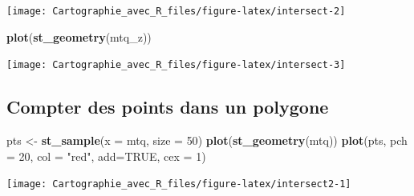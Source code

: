 \documentclass[]{book}
\newenvironment{Shaded}{\begin{snugshade}}{\end{snugshade}}
\newcommand{\KeywordTok}[1]{\textcolor[rgb]{0.13,0.29,0.53}{\textbf{#1}}}
\newcommand{\DataTypeTok}[1]{\textcolor[rgb]{0.13,0.29,0.53}{#1}}
\newcommand{\DecValTok}[1]{\textcolor[rgb]{0.00,0.00,0.81}{#1}}
\newcommand{\StringTok}[1]{\textcolor[rgb]{0.31,0.60,0.02}{#1}}
\newcommand{\OtherTok}[1]{\textcolor[rgb]{0.56,0.35,0.01}{#1}}
\newcommand{\OperatorTok}[1]{\textcolor[rgb]{0.81,0.36,0.00}{\textbf{#1}}}
\newcommand{\NormalTok}[1]{#1}
\begin{document}
\begin{center}\texttt{[image: Cartographie\_avec\_R\_files/figure-latex/intersect-2]} \end{center}

\begin{Shaded}
\begin{Highlighting}[]
\KeywordTok{plot}\NormalTok{(}\KeywordTok{st_geometry}\NormalTok{(mtq_z))}
\end{Highlighting}
\end{Shaded}

\begin{center}\texttt{[image: Cartographie\_avec\_R\_files/figure-latex/intersect-3]} \end{center}

\subsection{Compter des points dans un
polygone}\label{compter-des-points-dans-un-polygone}

\begin{Shaded}
\begin{Highlighting}[]
\NormalTok{pts <-}\StringTok{ }\KeywordTok{st_sample}\NormalTok{(}\DataTypeTok{x =}\NormalTok{ mtq, }\DataTypeTok{size =} \DecValTok{50}\NormalTok{)}
\KeywordTok{plot}\NormalTok{(}\KeywordTok{st_geometry}\NormalTok{(mtq))}
\KeywordTok{plot}\NormalTok{(pts, }\DataTypeTok{pch =} \DecValTok{20}\NormalTok{, }\DataTypeTok{col =} \StringTok{"red"}\NormalTok{, }\DataTypeTok{add=}\OtherTok{TRUE}\NormalTok{, }\DataTypeTok{cex =} \DecValTok{1}\NormalTok{)}
\end{Highlighting}
\end{Shaded}

\begin{center}\texttt{[image: Cartographie\_avec\_R\_files/figure-latex/intersect2-1]} \end{center}

\begin{Shaded}
\end{Shaded}
\end{document}
